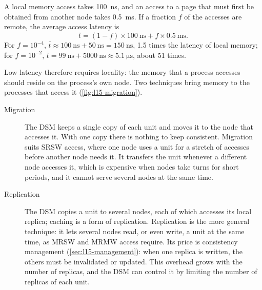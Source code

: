 \documentclass[../main.tex]{subfiles}
\begin{document}
\begin{example}
  \label{ex:l15-latency}
  A local memory access takes \SI{100}{\nano\second}, and an access to a
  page that must first be obtained from another node takes
  \SI{0.5}{\milli\second}.  If a fraction $f$ of the accesses are remote,
  the average access latency is
  \begin{equation}
    \bar{t} = (1-f)\times\SI{100}{\nano\second} + f\times\SI{0.5}{\milli\second} .
    \label{eq:l15-latency}
  \end{equation}
  For $f=10^{-4}$, $\bar{t} \approx \SI{100}{\nano\second} +
  \SI{50}{\nano\second} = \SI{150}{\nano\second}$, 1.5 times the latency of
  local memory; for $f=10^{-2}$, $\bar{t} = \SI{99}{\nano\second} +
  \SI{5000}{\nano\second} \approx \SI{5.1}{\micro\second}$, about 51 times.
\end{example}

Low latency therefore requires locality: the memory that a process accesses
should reside on the process's own node.  Two techniques bring memory to
the processes that access it (\cref{fig:l15-migration}).
\begin{description}
  \item[Migration] The DSM keeps a single copy of each unit and moves it to
    the node that accesses it.  With one copy there is nothing to keep
    consistent.  Migration suits SRSW access, where one node uses a unit
    for a stretch of accesses before another node needs it.  It transfers
    the unit whenever a different node accesses it, which is expensive when
    nodes take turns for short periods, and it cannot serve several nodes at
    the same time.
  \item[Replication] The DSM copies a unit to several nodes, each of which
    accesses its local replica; caching is a form of
    replication.
    Replication is the more general technique: it lets several nodes read,
    or even write, a unit at the same time, as MRSW and MRMW access
    require.  Its price is consistency management
    (\cref{sec:l15-management}): when one replica is written, the others
    must be invalidated or updated.  This overhead grows with the number of
    replicas, and the DSM can control it by limiting the number of replicas
    of each unit.
\end{description}
\end{document}
